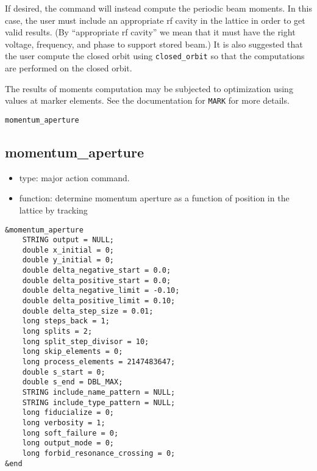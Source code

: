 \documentclass[11pt]{article}
\begin{document}
If desired, the command will instead compute the periodic beam
moments.  In this case, the user must include an appropriate rf cavity
in the lattice in order to get valid results.  (By ``appropriate rf
cavity'' we mean that it must have the right voltage, frequency, and
phase to support stored beam.)  It is also suggested that the user
compute the closed orbit using \verb|closed_orbit| so that the
computations are performed on the closed orbit.

The results of moments computation may be subjected to optimization
using values at marker elements.  See the documentation for
\verb|MARK| for more details.

\begin{latexonly}
\newpage
\begin{center}{\Large\verb|momentum_aperture|}\end{center}
\end{latexonly}
\subsection{momentum\_aperture \label{subsec:momentumaperture}}

\begin{itemize}
\item type: major action command.
\item function: determine momentum aperture as a function of position in the lattice by tracking
\end{itemize}

\begin{verbatim}
&momentum_aperture
    STRING output = NULL;
    double x_initial = 0;
    double y_initial = 0;
    double delta_negative_start = 0.0;
    double delta_positive_start = 0.0;
    double delta_negative_limit = -0.10;
    double delta_positive_limit = 0.10;
    double delta_step_size = 0.01;
    long steps_back = 1;
    long splits = 2;
    long split_step_divisor = 10;
    long skip_elements = 0;
    long process_elements = 2147483647;
    double s_start = 0;
    double s_end = DBL_MAX;
    STRING include_name_pattern = NULL;
    STRING include_type_pattern = NULL;
    long fiducialize = 0;
    long verbosity = 1;
    long soft_failure = 0;
    long output_mode = 0;
    long forbid_resonance_crossing = 0;
&end
\end{verbatim}
\end{document}
